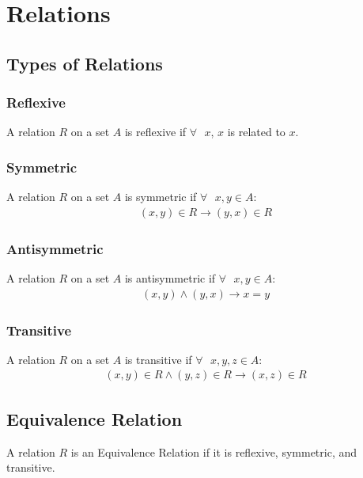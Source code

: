 \documentclass[12pt,letterpaper]{article} \usepackage{amsmath} \usepackage{graphicx}  \usepackage{longtable}  \usepackage{amssymb}
\begin{document}
    \section{Relations}

        \subsection{Types of Relations}

            \subsubsection{Reflexive}
            A relation $R$ on a set $A$ is reflexive if $\forall \text{ }x$, $x$ is related to $x$.

            \subsubsection{Symmetric}
            A relation $R$ on a set $A$ is symmetric if $\forall \text{ } x, y \in A$:
            \begin{align*}
                (x,y)\in R \to (y,x) \in R
            \end{align*}

            \subsubsection{Antisymmetric}
            A relation $R$ on a set $A$ is antisymmetric if $\forall \text{ } x,y \in A$:
            \begin{align*}
                (x,y)\land (y,x) \to x=y
            \end{align*}

            \subsubsection{Transitive}
            A relation $R$ on a set $A$ is transitive if $\forall \text{ }x,y,z \in A$:
            \begin{align*}
                (x,y)\in R \land (y,z)\in R \to (x,z)\in R
            \end{align*}

        \subsection{Equivalence Relation}
        A relation $R$ is an Equivalence Relation if it is reflexive, symmetric, and transitive. 
\end{document}
